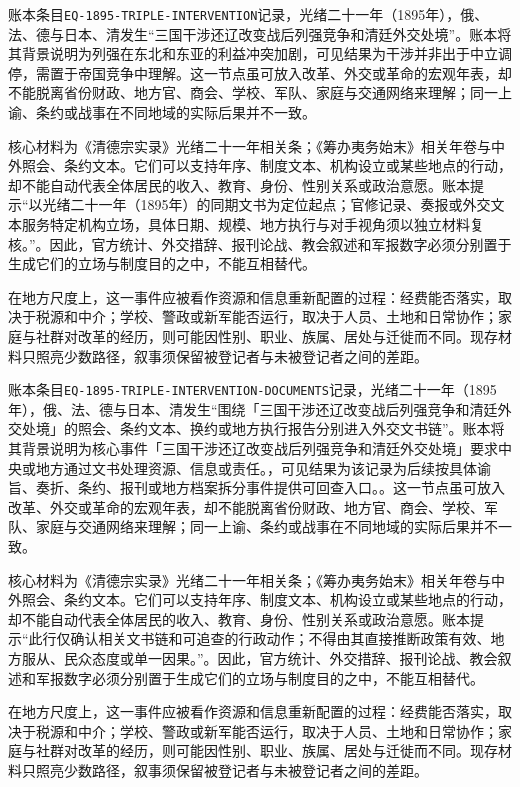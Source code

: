 账本条目\texttt{EQ-1895-TRIPLE-INTERVENTION}记录，光绪二十一年（1895年），俄、法、德与日本、清发生“三国干涉还辽改变战后列强竞争和清廷外交处境”。账本将其背景说明为列强在东北和东亚的利益冲突加剧，可见结果为干涉并非出于中立调停，需置于帝国竞争中理解。这一节点虽可放入改革、外交或革命的宏观年表，却不能脱离省份财政、地方官、商会、学校、军队、家庭与交通网络来理解；同一上谕、条约或战事在不同地域的实际后果并不一致。

核心材料为《清德宗实录》光绪二十一年相关条；《筹办夷务始末》相关年卷与中外照会、条约文本。它们可以支持年序、制度文本、机构设立或某些地点的行动，却不能自动代表全体居民的收入、教育、身份、性别关系或政治意愿。账本提示“以光绪二十一年（1895年）的同期文书为定位起点；官修记录、奏报或外交文本服务特定机构立场，具体日期、规模、地方执行与对手视角须以独立材料复核。”。因此，官方统计、外交措辞、报刊论战、教会叙述和军报数字必须分别置于生成它们的立场与制度目的之中，不能互相替代。

在地方尺度上，这一事件应被看作资源和信息重新配置的过程：经费能否落实，取决于税源和中介；学校、警政或新军能否运行，取决于人员、土地和日常协作；家庭与社群对改革的经历，则可能因性别、职业、族属、居处与迁徙而不同。现存材料只照亮少数路径，叙事须保留被登记者与未被登记者之间的差距。

账本条目\texttt{EQ-1895-TRIPLE-INTERVENTION-DOCUMENTS}记录，光绪二十一年（1895年），俄、法、德与日本、清发生“围绕「三国干涉还辽改变战后列强竞争和清廷外交处境」的照会、条约文本、换约或地方执行报告分别进入外交文书链”。账本将其背景说明为核心事件「三国干涉还辽改变战后列强竞争和清廷外交处境」要求中央或地方通过文书处理资源、信息或责任。，可见结果为该记录为后续按具体谕旨、奏折、条约、报刊或地方档案拆分事件提供可回查入口。。这一节点虽可放入改革、外交或革命的宏观年表，却不能脱离省份财政、地方官、商会、学校、军队、家庭与交通网络来理解；同一上谕、条约或战事在不同地域的实际后果并不一致。

核心材料为《清德宗实录》光绪二十一年相关条；《筹办夷务始末》相关年卷与中外照会、条约文本。它们可以支持年序、制度文本、机构设立或某些地点的行动，却不能自动代表全体居民的收入、教育、身份、性别关系或政治意愿。账本提示“此行仅确认相关文书链和可追查的行政动作；不得由其直接推断政策有效、地方服从、民众态度或单一因果。”。因此，官方统计、外交措辞、报刊论战、教会叙述和军报数字必须分别置于生成它们的立场与制度目的之中，不能互相替代。

在地方尺度上，这一事件应被看作资源和信息重新配置的过程：经费能否落实，取决于税源和中介；学校、警政或新军能否运行，取决于人员、土地和日常协作；家庭与社群对改革的经历，则可能因性别、职业、族属、居处与迁徙而不同。现存材料只照亮少数路径，叙事须保留被登记者与未被登记者之间的差距。

